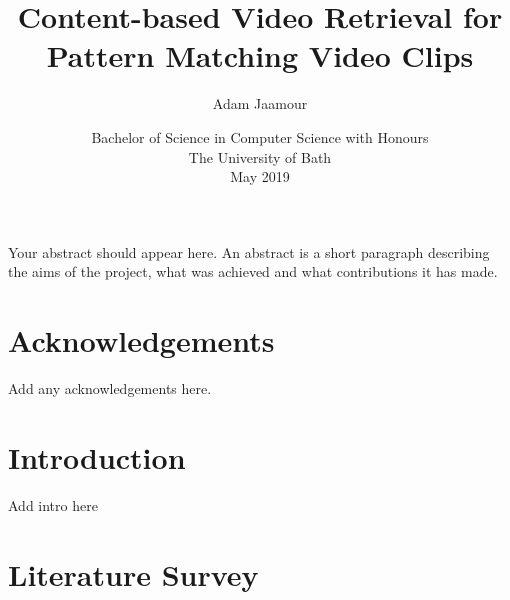 \documentclass[11pt,openright,twoside,a4paper]{report}
\title{Content-based Video Retrieval for Pattern Matching Video Clips}
\author{Adam Jaamour}
\date{Bachelor of Science in Computer Science with Honours\\The University of Bath\\May 2019}
\begin{document}
\setcounter{page}{0}

\maketitle
\newpage

\newpage

\newpage

\abstract
Your abstract should appear here.  An abstract is a short
paragraph describing the aims of the project, what was
achieved and what contributions it has made.
\newpage

\tableofcontents
\newpage
\listoffigures
\newpage
\listoftables
\newpage

\chapter*{Acknowledgements}
Add any acknowledgements here.
\newpage

\setcounter{page}{1}

\chapter{Introduction}
Add intro here
% 

\chapter{Literature Survey}




\end{document}
